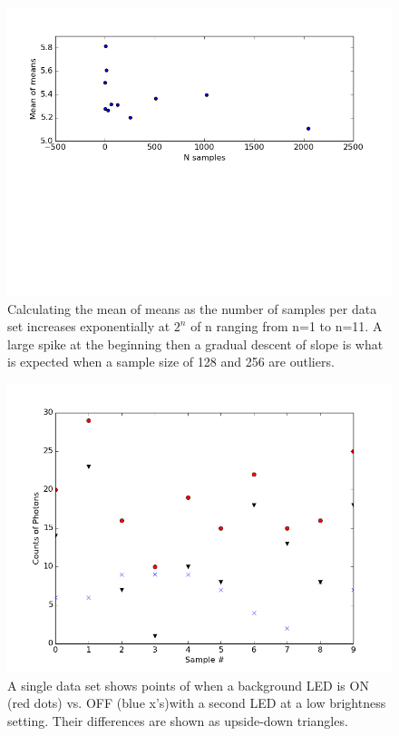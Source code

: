 \documentclass[12 pt,twoside]{article}
\begin{document}
\begin{center}
\begin{figure}[!hb]
\includegraphics[scale=0.7]{figure_8}
\caption{\small Calculating the mean of means as the number of samples per data set increases exponentially at $2^n$ of n ranging from n=1 to n=11. A large spike at the beginning then a gradual descent of slope is what is  expected when a sample size of 128 and 256 are outliers. }
\end{figure}
\end{center}

\begin{center}
\begin{figure}[!hb]
\includegraphics[scale=0.7]{figure_9}
\caption{\small A single data set shows points of when a background LED is ON (red dots) vs. OFF (blue x's)with a second LED at a low brightness setting. Their differences are shown as upside-down triangles.}
\end{figure}
\end{center}
\end{document}
